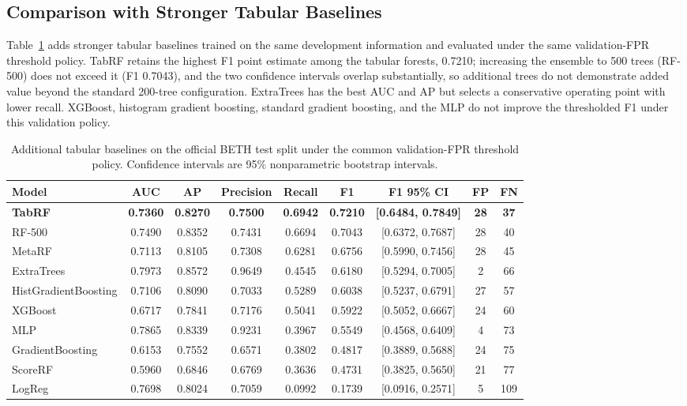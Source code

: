 \documentclass[10pt,journal,compsoc]{IEEEtran}
\begin{document}
\subsection{Comparison with Stronger Tabular Baselines}

Table~\ref{tab:sota_tabular} adds stronger tabular baselines trained on the same development information and evaluated under the same validation-FPR threshold policy. TabRF retains the highest F1 point estimate among the tabular forests, 0.7210; increasing the ensemble to 500 trees (RF-500) does not exceed it (F1 0.7043), and the two confidence intervals overlap substantially, so additional trees do not demonstrate added value beyond the standard 200-tree configuration. ExtraTrees has the best AUC and AP but selects a conservative operating point with lower recall. XGBoost, histogram gradient boosting, standard gradient boosting, and the MLP do not improve the thresholded F1 under this validation policy.

\begin{table}[t]
\centering
\caption{Additional tabular baselines on the official BETH test split under the common validation-FPR threshold policy. Confidence intervals are 95\% nonparametric bootstrap intervals.}
\label{tab:sota_tabular}
\begin{tabular}{lcccccccc}
\toprule
\textbf{Model} & \textbf{AUC} & \textbf{AP} & \textbf{Precision} & \textbf{Recall} & \textbf{F1} & \textbf{F1 95\% CI} & \textbf{FP} & \textbf{FN} \\
\midrule
\textbf{TabRF} & \textbf{0.7360} & \textbf{0.8270} & \textbf{0.7500} & \textbf{0.6942} & \textbf{0.7210} & \textbf{[0.6484, 0.7849]} & \textbf{28} & \textbf{37} \\
RF-500 & 0.7490 & 0.8352 & 0.7431 & 0.6694 & 0.7043 & [0.6372, 0.7687] & 28 & 40 \\
MetaRF & 0.7113 & 0.8105 & 0.7308 & 0.6281 & 0.6756 & [0.5990, 0.7456] & 28 & 45 \\
ExtraTrees & 0.7973 & 0.8572 & 0.9649 & 0.4545 & 0.6180 & [0.5294, 0.7005] & 2 & 66 \\
HistGradientBoosting & 0.7106 & 0.8090 & 0.7033 & 0.5289 & 0.6038 & [0.5237, 0.6791] & 27 & 57 \\
XGBoost & 0.6717 & 0.7841 & 0.7176 & 0.5041 & 0.5922 & [0.5052, 0.6667] & 24 & 60 \\
MLP & 0.7865 & 0.8339 & 0.9231 & 0.3967 & 0.5549 & [0.4568, 0.6409] & 4 & 73 \\
GradientBoosting & 0.6153 & 0.7552 & 0.6571 & 0.3802 & 0.4817 & [0.3889, 0.5688] & 24 & 75 \\
ScoreRF & 0.5960 & 0.6846 & 0.6769 & 0.3636 & 0.4731 & [0.3825, 0.5650] & 21 & 77 \\
LogReg & 0.7698 & 0.8024 & 0.7059 & 0.0992 & 0.1739 & [0.0916, 0.2571] & 5 & 109 \\
\bottomrule
\end{tabular}
\end{table}
\end{document}

